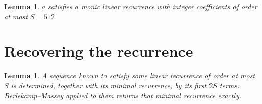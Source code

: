 \documentclass[11pt,a4paper]{article}
\theoremstyle{plain}
\newtheorem{lemma}[theorem]{Lemma}
\theoremstyle{definition}
\begin{document}
\begin{lemma}\label{lem:cf}
$a$ satisfies a monic linear recurrence with integer coefficients of order at most $S=512$.
\end{lemma}

\section{Recovering the recurrence}

\begin{lemma}\label{lem:bm}
A sequence known to satisfy some linear recurrence of order at most $S$ is determined, together
with its minimal recurrence, by its first $2S$ terms: Berlekamp--Massey applied to them returns
that minimal recurrence exactly.
\end{lemma}
\end{document}
